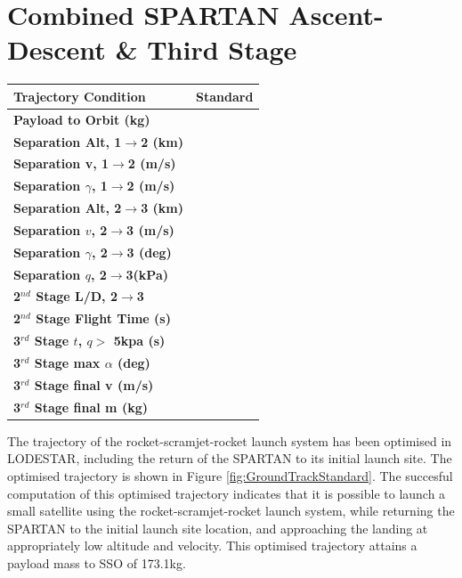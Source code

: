 \section{Combined SPARTAN Ascent-Descent \& Third Stage}
\begin{table}[ht]
	\centering
\begin{tabular}{l c } 
	\hline \textbf{Trajectory Condition}
	&Standard

	\\
	\hline \textbf{Payload to Orbit (kg)}
	& \PayloadToOrbitStandard
	\\
	\textbf{Separation Alt, 1$\rightarrow$2 (km)}
	& \firstsecondSeparationAltStandard
	\\
	\textbf{Separation v, 1$\rightarrow$2 (m/s)}
	& \firstsecondSeparationvStandard
	\\
	\textbf{Separation $\gamma$, 1$\rightarrow$2 (m/s)}
	& \firstsecondSeparationgammaStandard
	\\
	\textbf{Separation Alt, 2$\rightarrow$3 (km)}
	& \secondthirdSeparationAltStandard
	\\
	\textbf{Separation $v$, 2$\rightarrow$3 (m/s)}
	& \secondthirdSeparationvStandard
	\\
	\textbf{Separation $\gamma$, 2$\rightarrow$3 (deg)}
	& \secondthirdSeparationgammaStandard
	\\
	\textbf{Separation $q$, 2$\rightarrow$3(kPa)}
	& \secondthirdSeparationqStandard
	\\
	\textbf{2$^{nd}$ Stage L/D, 2$\rightarrow$3}
	& \secondthirdSeparationLDStandard
	\\
	\textbf{2$^{nd}$ Stage Flight Time (s)}
	& \secondFlightTimeStandard
	\\
	\textbf{3$^{rd}$ Stage $t$, $q >$ 5kpa (s)}
	& \thirdqOverFiveStandard
	\\
	\textbf{3$^{rd}$ Stage max $\alpha$ (deg)}
	& \thirdmaxAoAStandard
	\\
	\textbf{3$^{rd}$ Stage final v (m/s)}
	& \thirdcircvStandard
	\\
	\textbf{3$^{rd}$ Stage final m (kg)}
	& \thirdcircmStandard
	\\
	\hline 
\end{tabular}
\end{table}

The trajectory of the rocket-scramjet-rocket launch system has been optimised in LODESTAR, including the return of the SPARTAN to its initial launch site. The optimised trajectory is shown in Figure \ref{fig:GroundTrackStandard}. The succesful computation of this optimised trajectory indicates that it is possible to launch a small satellite using the rocket-scramjet-rocket launch system, while returning the SPARTAN to the initial launch site location, and approaching the landing at appropriately low altitude and velocity. 
This optimised trajectory attains a payload mass to SSO of 173.1kg. 

